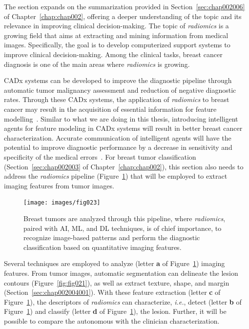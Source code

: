 The section expands on the summarization provided in Section~\ref{sec:chap002006} of Chapter~\ref{chap:chap002}, offering a deeper understanding of the topic and its relevance in improving clinical decision-making.
The topic of {\it radiomics} is a growing field that aims at extracting and mining information from medical images.
Specifically, the goal is to develop computerized support systems to improve clinical decision-making.
Among the clinical tasks, breast cancer diagnosis is one of the main areas where {\it radiomics} is growing.

\ac{CADx} systems can be developed to improve the diagnostic pipeline through automatic tumor malignancy assessment and reduction of negative diagnostic rates.
Through these \ac{CADx} systems, the application of {\it radiomics} to breast cancer may result in the acquisition of essential information for feature modelling~\cite{10.1007/978-3-030-59716-0_71}.
Similar to what we are doing in this thesis, introducing intelligent agents for feature modeling in \ac{CADx} systems will result in better breast cancer characterization.
Accurate communication of intelligent agents will have the potential to improve diagnostic performance by a decrease in sensitivity and specificity of the medical errors~\cite{doi:10.1148/radiol.2020192039}.
For breast tumor classification (Section~\ref{sec:chap002003} of Chapter~\ref{chap:chap002}), this section also needs to address the {\it radiomics} pipeline (Figure~\ref{fig:fig023}) that will be employed to extract imaging features from tumor images.

\begin{figure}[htbp]
\centering
\texttt{[image: images/fig023]}
\caption{Breast tumors are analyzed through this pipeline, where {\it radiomics}, paired with AI, ML, and DL techniques, is of chief importance, to recognize image-based patterns and perform the diagnostic classification based on quantitative imaging features.}
\label{fig:fig023}
\end{figure}

Several techniques are employed to analyze (letter {\bf a} of Figure~\ref{fig:fig023}) imaging features.
From tumor images, automatic segmentation can delineate the lesion contours (Figure~\ref{fig:fig021}), as well as extract texture, shape, and margin (Section~\ref{sec:chap002004001}).
With these feature extraction (letter {\bf c} of Figure~\ref{fig:fig023}), the descriptors of {\it radiomics} can characterize, {\it i.e.}, detect (letter {\bf b} of Figure~\ref{fig:fig023}) and classify (letter {\bf d} of Figure~\ref{fig:fig023}), the lesion.
Further, it will be possible to compare the autonomous with the clinician characterization.

